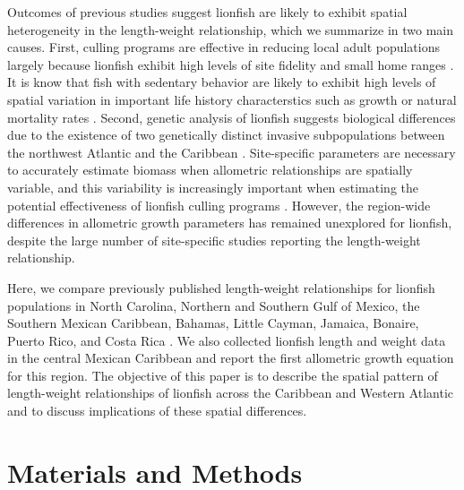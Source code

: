 \documentclass[]{article}
\theoremstyle{definition}
\theoremstyle{definition}
\theoremstyle{definition}
\theoremstyle{remark}
\begin{document}
Outcomes of previous studies suggest lionfish are likely to exhibit
spatial heterogeneity in the length-weight relationship, which we
summarize in two main causes. First, culling programs are effective in
reducing local adult populations largely because lionfish exhibit high
levels of site fidelity and small home ranges
\citep{Fishelson_1997,kochzius_2005,jud_2012,cote_2014}. It is know that
fish with sedentary behavior are likely to exhibit high levels of
spatial variation in important life history characterstics such as
growth or natural mortality rates
\citep{gunderson_2008,hutchinson_2008,wilson_2012,guan_2013}. Second,
genetic analysis of lionfish suggests biological differences due to the
existence of two genetically distinct invasive subpopulations between
the northwest Atlantic and the Caribbean \citep{betancurr_2011}.
Site-specific parameters are necessary to accurately estimate biomass
when allometric relationships are spatially variable, and this
variability is increasingly important when estimating the potential
effectiveness of lionfish culling programs
\citep{barbour_2011,morris_2011,cote_2014,johnston_2015}. However, the
region-wide differences in allometric growth parameters has remained
unexplored for lionfish, despite the large number of site-specific
studies reporting the length-weight relationship.

Here, we compare previously published length-weight relationships for
lionfish populations in North Carolina, Northern and Southern Gulf of
Mexico, the Southern Mexican Caribbean, Bahamas, Little Cayman, Jamaica,
Bonaire, Puerto Rico, and Costa Rica
\citep{barbour_2011,darling_2011,deleon_2013,fogg_2013,dahl_2014,edwards_2014,toledohernndez_2014,sandel_2015,aguilarperera_2016,sabidoitza_2016,sabidoitz_2016,chin_2016}.
We also collected lionfish length and weight data in the central Mexican
Caribbean and report the first allometric growth equation for this
region. The objective of this paper is to describe the spatial pattern
of length-weight relationships of lionfish across the Caribbean and
Western Atlantic and to discuss implications of these spatial
differences.

\section{Materials and Methods}\label{materials-and-methods}
\end{document}
